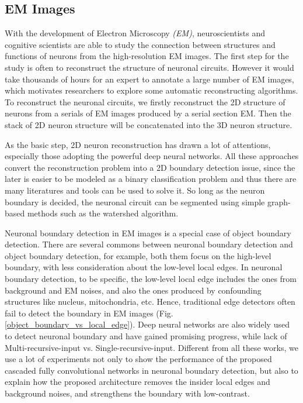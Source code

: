 \documentclass[senior]{IPSstyle}
\begin{document}
\subsection{EM Images}
With the development of Electron Microscopy \emph{(EM)}, neuroscientists and cognitive scientists are able to study the connection between structures and functions of neurons from the high-resolution EM images\cite{Lichtman2011}. The first step for the study is often to reconstruct the structure of neuronal circuits. However it would take thousands of hours for an expert to annotate a large number of EM images, which motivates researchers to explore some automatic reconstructing algorithms. To reconstruct the neuronal circuits, we firstly reconstruct the 2D structure of neurons from a serials of EM images produced by a serial section EM. Then the stack of 2D neuron structure will be concatenated into the 3D neuron structure. 

As the basic step, 2D neuron reconstruction has drawn a lot of attentions, especially those adopting the powerful deep neural networks\cite{Ciresan2012, Lee2015, Quan2016}. All these approaches convert the reconstruction problem into a 2D boundary detection issue, since the later is easier to be modeled as a binary classification problem and thus there are many literatures and tools can be used to solve it. So long as the neuron boundary is decided, the neuronal circuit can be segmented using simple graph-based methods such as the watershed algorithm\cite{Zlateski2015}. 

Neuronal boundary detection in EM images is a special case of object boundary detection. There are several commons between neuronal boundary detection and object boundary detection, for example, both them focus on the high-level boundary, with less consideration about the low-level local edges. In neuronal boundary detection, to be specific, the low-level local edge includes the ones from background and EM noises, and also the ones produced by confounding structures like nucleus, mitochondria, etc. Hence, traditional edge detectors\cite{Xie2015, Canny1986, Sobel2014} often fail to detect the boundary in EM images (Fig. \ref{object_boundary_vs_local_edge}). Deep neural networks are also widely used to detect neuronal boundary and have gained promising progress\cite{Ciresan2012, Lee2015}, while lack of Multi-recursive-input vs. Single-recursive-input. Different from all these works, we use a lot of experiments not only to show the performance of the proposed cascaded fully convolutional networks in neuronal boundary detection, but also to explain how the proposed architecture removes the insider local edges and background noises, and strengthens the boundary with low-contrast.
\end{document}
